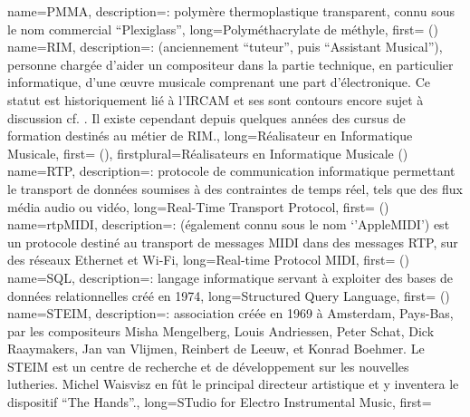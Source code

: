 {
    name={PMMA},
    description={\textit{}: polymère thermoplastique transparent, connu sous le nom commercial ``Plexiglass''},
    long={Polyméthacrylate de méthyle},
    first={ ()}
}
{
    name={RIM},
    description={\textit{}: (anciennement ``tuteur'', puis ``Assistant Musical''), personne chargée d'aider un compositeur dans la partie technique, en particulier informatique, d'une œuvre musicale comprenant une part d'électronique. Ce statut est historiquement lié à l'\gls{IRCAM} et ses sont contours encore sujet à discussion cf. \cite{zattra_les_2013}. Il existe cependant depuis quelques années des cursus de formation destinés au métier de RIM.},
    long={Réalisateur en Informatique Musicale},
    first={ ()},
    firstplural={Réalisateurs en Informatique Musicale (\glspluralsuffix)}
}
{
    name={RTP},
    description={\textit{}: protocole de communication informatique permettant le transport de données soumises à des contraintes de temps réel, tels que des flux média audio ou vidéo},
    long={Real-Time Transport Protocol},
    first={ ()}
}
{
    name={rtpMIDI},
    description={\textit{}: (également connu sous le nom `'AppleMIDI') est un protocole destiné au transport de messages MIDI dans des messages \gls{RTP}, sur des réseaux Ethernet et Wi-Fi},
    long={Real-time Protocol MIDI},
    first={ ()}
}
{
    name={SQL},
    description={\textit{}: langage informatique servant à exploiter des bases de données relationnelles créé en 1974},
    long={Structured Query Language},
    first={ ()}
}
{
    name={STEIM},
    description={\textit{}: association créée en 1969 à Amsterdam, Pays-Bas, par les compositeurs Misha Mengelberg, Louis Andriessen, Peter Schat, Dick Raaymakers, Jan van Vlijmen, Reinbert de Leeuw, et Konrad Boehmer. Le STEIM est un centre de recherche et de développement sur les nouvelles lutheries. Michel Waisvisz en fût le principal directeur artistique et y inventera le dispositif ``The Hands''.},
    long={STudio for Electro Instrumental Music},
    first={}
}
